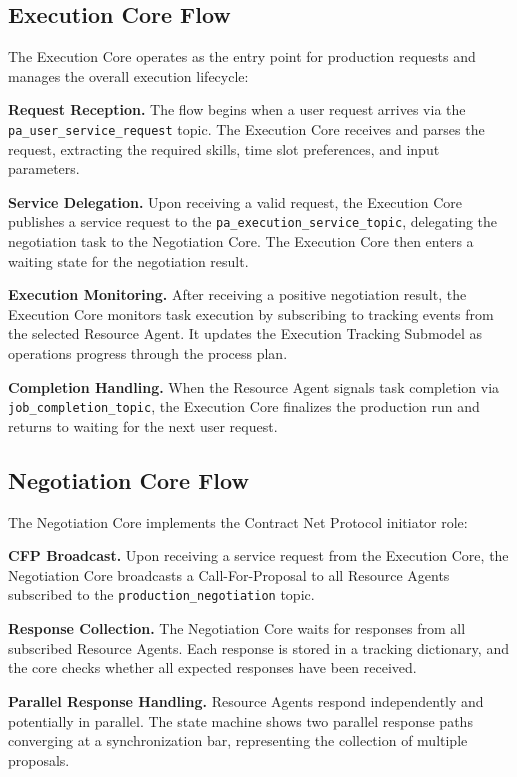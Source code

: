 \subsection{Execution Core Flow}

The Execution Core operates as the entry point for production requests and manages the overall execution lifecycle:

\textbf{Request Reception.} The flow begins when a user request arrives via the \texttt{pa\_user\_service\_request} topic. The Execution Core receives and parses the request, extracting the required skills, time slot preferences, and input parameters.

\textbf{Service Delegation.} Upon receiving a valid request, the Execution Core publishes a service request to the \texttt{pa\_execution\_service\_topic}, delegating the negotiation task to the Negotiation Core. The Execution Core then enters a waiting state for the negotiation result.

\textbf{Execution Monitoring.} After receiving a positive negotiation result, the Execution Core monitors task execution by subscribing to tracking events from the selected Resource Agent. It updates the Execution Tracking Submodel as operations progress through the process plan.

\textbf{Completion Handling.} When the Resource Agent signals task completion via \texttt{job\_completion\_topic}, the Execution Core finalizes the production run and returns to waiting for the next user request.

\subsection{Negotiation Core Flow}

The Negotiation Core implements the Contract Net Protocol initiator role:

\textbf{CFP Broadcast.} Upon receiving a service request from the Execution Core, the Negotiation Core broadcasts a Call-For-Proposal to all Resource Agents subscribed to the \texttt{production\_negotiation} topic.

\textbf{Response Collection.} The Negotiation Core waits for responses from all subscribed Resource Agents. Each response is stored in a tracking dictionary, and the core checks whether all expected responses have been received.

\textbf{Parallel Response Handling.} Resource Agents respond independently and potentially in parallel. The state machine shows two parallel response paths converging at a synchronization bar, representing the collection of multiple proposals.

